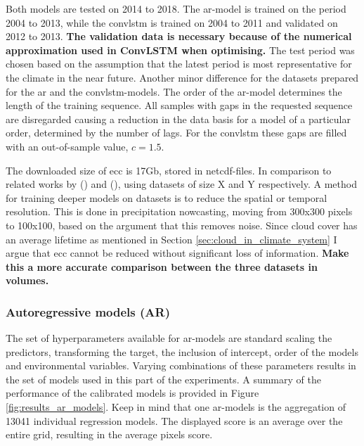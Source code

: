 Both models are tested on 2014 to 2018. The \acrshort{ar}-model is trained on the period 2004 to 2013, while the \acrshort{convlstm} is trained on  2004 to 2011 and validated on 2012 to 2013. \textbf{The validation data is necessary because of the numerical approximation used in ConvLSTM when optimising.} The test period was chosen based on the assumption that the latest period is most representative for the climate in the near future. Another minor difference for the datasets prepared for the \acrshort{ar} and the \acrshort{convlstm}-models. The order of the \acrshort{ar}-model determines the length of the training sequence. All samples with gaps in the requested sequence are disregarded causing a reduction in the data basis for a model of a particular order, determined by the number of lags. For the \acrshort{convlstm} these gaps are filled with an out-of-sample value, $c=1.5$. 

The downloaded size of \acrshort{ecc} is 17Gb, stored in \acrshort{netcdf}-files. 
In comparison to related works by \citeauthor{precip_nowcasting} (\citeyear{precip_nowcasting}) and \citeauthor{SunAirLSTM} (\citeyear{SunAirLSTM}), using datasets of size X and Y respectively. A method for training deeper models on datasets is to reduce the spatial or temporal resolution. This is done in precipitation nowcasting, moving from 300x300 pixels to 100x100, based on the argument that this  removes noise. Since cloud cover has an average lifetime as mentioned in Section \ref{sec:cloud_in_climate_system} I argue that \acrshort{ecc} cannot be reduced without significant loss of information. \textbf{Make this a more accurate comparison between the three datasets in volumes.}

\subsubsection{Autoregressive models (AR)}
The set of hyperparameters available for \acrshort{ar}-models are
standard scaling the predictors, transforming the target, the inclusion of intercept, order of the models and environmental variables. Varying combinations of these parameters results in the set of models used in this part of the experiments. A summary of the performance of the calibrated models is provided in Figure \ref{fig:results_ar_models}. Keep in mind that one \acrshort{ar}-models is the aggregation of 13041 individual regression models. The displayed score is an average over the entire grid, resulting in the average pixels score.

